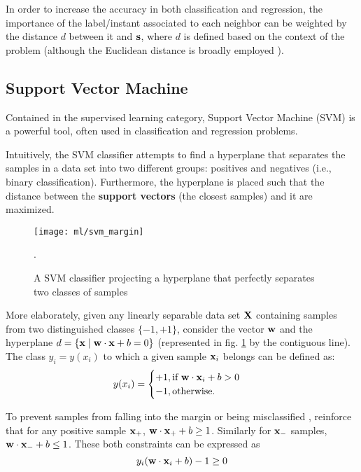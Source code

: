 In order to increase the accuracy in both classification and regression, the importance of the label/instant associated to each neighbor can be weighted by the distance $d$ between it and $\mathbf{s}$, where $d$ is defined based on the context of the problem (although the Euclidean distance is broadly employed \cite{elkan2011nearest}).

\subsection{Support Vector Machine}

Contained in the supervised learning category, Support Vector Machine (SVM) is a powerful tool, often used in classification and regression problems.

Intuitively, the SVM classifier attempts to find a hyperplane that separates the samples in a data set into two different groups: positives and negatives (i.e., binary classification). Furthermore, the hyperplane is placed such that the distance between the \textbf{support vectors} (the closest samples) and it are maximized.

\begin{figure}[H]
	\centering
	\captionsetup{justification=centering}

	\texttt{[image: ml/svm\_margin]}
	\caption{A SVM classifier projecting a hyperplane that perfectly separates two classes of samples \cite{sksvm}}.
	\label{fig:svmmargin}
\end{figure}

More elaborately, given any linearly separable data set $\mathbf{X}$ containing samples from two distinguished classes $\{-1, +1\}$, consider the vector $\mathbf{w}$ and the hyperplane $d = \{\mathbf{x} \mid \mathbf{w} \cdot \mathbf{x} + b = 0\}$ (represented in fig. \ref{fig:svmmargin} by the contiguous line). The class $y_i = y(x_i)$ to which a given sample $\mathbf{x}_i$ belongs can be defined as:
\begin{align*}
	y(x_i) = \begin{cases}
		+1, \text{if } \mathbf{w} \cdot \mathbf{x}_i +b > 0 \\
		-1, \text{otherwise.}
	\end{cases}
\end{align*}

To prevent samples from falling into the margin or being misclassified \cite{wessvmdef}, reinforce that for any positive sample $\mathbf{x}_+$, $\mathbf{w} \cdot \mathbf{x}_+ +b \geq 1$. Similarly for $\mathbf{x}_-$ samples, $\mathbf{w} \cdot \mathbf{x}_- +b \leq 1$. These both constraints can be expressed as
\begin{equation} \label{svmconst}
y_i(\mathbf{w} \cdot \mathbf{x}_i +b) -1 \geq 0
\end{equation}

